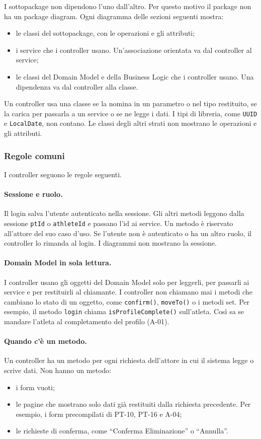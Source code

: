 I sottopackage non dipendono l'uno dall'altro. Per questo motivo il
package non ha un package diagram. Ogni diagramma delle sezioni
seguenti mostra:
\begin{itemize}
  \item le classi del sottopackage, con le operazioni e gli attributi;
  \item i service che i controller usano. Un'associazione orientata va
    dal controller al service;
  \item le classi del Domain Model e della Business Logic che i
    controller usano. Una dipendenza va dal controller alla classe.
\end{itemize}
Un controller usa una classe se la nomina in un parametro o nel tipo
restituito, se la carica per passarla a un service o se ne legge i
dati. I tipi di libreria, come \texttt{UUID} e \texttt{LocalDate}, non
contano. Le classi degli altri strati non mostrano le operazioni e gli
attributi.

\subsubsection{Regole comuni}
I controller seguono le regole seguenti.

\paragraph{Sessione e ruolo.} Il login salva l'utente autenticato nella
sessione. Gli altri metodi leggono dalla sessione \texttt{ptId} o
\texttt{athleteId} e passano l'id ai service. Un metodo è riservato
all'attore del suo caso d'uso. Se l'utente non è autenticato o ha un
altro ruolo, il controller lo rimanda al login. I diagrammi non
mostrano la sessione.

\paragraph{Domain Model in sola lettura.} I controller usano gli oggetti
del Domain Model solo per leggerli, per passarli ai service e per
restituirli al chiamante. I controller non chiamano mai i metodi che
cambiano lo stato di un oggetto, come \texttt{confirm()},
\texttt{moveTo()} o i metodi set. Per esempio, il metodo \texttt{login}
chiama \texttt{isProfileComplete()} sull'atleta. Così sa se mandare
l'atleta al completamento del profilo (A-01).

\paragraph{Quando c'è un metodo.} Un controller ha un metodo per ogni
richiesta dell'attore in cui il sistema legge o scrive dati. Non hanno
un metodo:
\begin{itemize}
  \item i form vuoti;
  \item le pagine che mostrano solo dati già restituiti dalla richiesta
    precedente. Per esempio, i form precompilati di PT-10, PT-16 e
    A-04;
  \item le richieste di conferma, come \enquote{Conferma Eliminazione}
    o \enquote{Annulla}.
\end{itemize}

